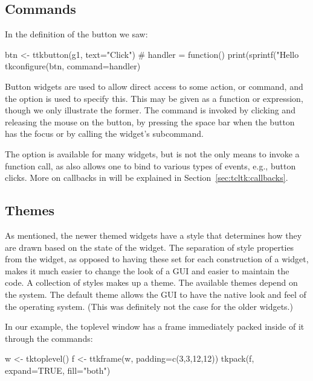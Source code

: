 \subsection{Commands}
\label{sec:tcltk-intro-commands}


In the definition of the button we saw:

\begin{Schunk}
\begin{Sinput}
 btn <- ttkbutton(g1, text="Click")
 #
 handler = function() print(sprintf("Hello %
 tkconfigure(btn, command=handler)
\end{Sinput}
\end{Schunk}

Button widgets are used to allow direct access to some action, or
command, and the  option is used to specify this. This
may be given as a function or expression, though we only illustrate
the former. The command is invoked by clicking and releasing the mouse
on the button, by pressing the space bar when the button has the focus
or by calling the widget's 
subcommand. 

The  option is available for many widgets, but is not
the only means to invoke a function call, as \Tk{} also allows one to
bind to various types of events, e.g., button clicks.  More on
callbacks in  will be explained in
Section~\ref{sec:tcltk:callbacks}.




\subsection{Themes}
\label{sec:tcltk:overview:themes}


As mentioned, the newer themed widgets have a style that determines
how they are drawn based on the state of the widget. The separation of
style properties from the widget, as opposed to having these set for
each construction of a widget, makes it much easier to change the look
of a GUI and easier to maintain the code. A collection of styles makes
up a theme. The available themes depend on the system. The default
theme allows the GUI to have the native look and feel of the operating
system. (This was definitely not the case for the older \TK\/
widgets.)

In our example, the toplevel window has a frame immediately packed
inside of it through the commands:
\begin{Schunk}
\begin{Sinput}
 w <- tktoplevel()
 f <- ttkframe(w, padding=c(3,3,12,12))
 tkpack(f, expand=TRUE, fill="both")
\end{Sinput}
\end{Schunk}

